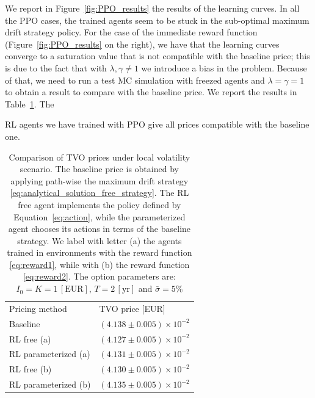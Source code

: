 \documentclass[runningheads]{m2ef}
\newcommand\soutpars[1]{\let\helpcmd\sout\parhelp#1\par\relax\relax}
\newcommand{\change}[1]{{\color{red} {#1}}}%
\newcommand{\remove}[1]{{\color{red} \soutpars{{#1}}}}%
\begin{document}
We report in Figure~\ref{fig:PPO_results} the results of the learning curves. In all the PPO cases, the trained agents seem to be stuck in the sub-optimal maximum drift strategy policy. For the case of the immediate reward function (Figure~\ref{fig:PPO_results} on the right), we have that the learning curves converge to a saturation value that is not compatible with the baseline price; this is due to the fact that with $\lambda,\gamma \neq 1$ we introduce a bias in the problem. Because of that, we need to run a test MC simulation with freezed agents and $\lambda=\gamma=1$ to obtain a result to compare with the baseline price. We report the results in Table~\ref{tab:mc_results_lv}. The \remove{Reinforcement Learning} \change{RL} agents we have trained with PPO give all prices compatible with the baseline one.
\begin{table}
\begin{center}
\caption{Comparison of TVO prices under local volatility \change{scenario}. The baseline price is obtained by applying path-wise the maximum drift strategy \eqref{eq:analytical_solution_free_strategy}. The RL free agent implements the policy defined by Equation~\eqref{eq:action}, while the parameterized agent chooses its actions in terms of the baseline strategy. We label with letter (a) the agents trained in environments with the reward function \eqref{eq:reward1}, while with (b) the reward function \eqref{eq:reward2}. The option parameters are: $I_0=K=1\,[\text{EUR}]$, $T=2\,[\text{yr}]$ and $\bar{\sigma}=5\%$}
\label{tab:mc_results_lv}
\begin{tabular}{ll}
\hline\noalign{\smallskip}
Pricing method & TVO price [EUR] \\
\noalign{\smallskip}
\hline
\noalign{\smallskip}
Baseline &  $(4.138 \pm 0.005)\times 10^{-2}$\\
RL free (a) & $(4.127 \pm 0.005) \times 10^{-2}$ \\
RL parameterized (a) & $(4.131 \pm 0.005) \times 10^{-2}$ \\
RL free (b) & $(4.130 \pm 0.005) \times 10^{-2}$ \\
RL parameterized (b) & $(4.135 \pm 0.005) \times 10^{-2}$ \\
\hline
\end{tabular}
\end{center}
\end{table}
\setlength{\tabcolsep}{1.4pt}
\end{document}
